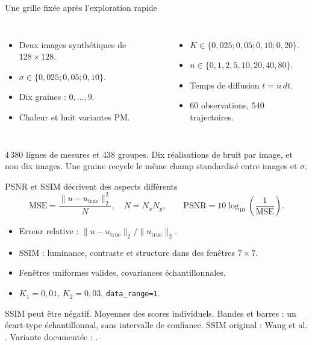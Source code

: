 \documentclass[aspectratio=169,11pt]{beamer}
\newcommand{\sectionlabel}{Projet de Master}
\newcommand{\utrue}{u_{\mathrm{true}}}
\newcommand{\smallgap}{\vspace{0.18cm}}
\begin{document}
\renewcommand{\sectionlabel}{02 / Protocole et vérification}
\begin{frame}[label=protocole]{Une grille fixée après l'exploration rapide}
  \begin{columns}[T,onlytextwidth]
    \begin{itemize}
      \item Deux images synthétiques de $128\times128$.
      \item $\sigma\in\{0{,}025;0{,}05;0{,}10\}$.
      \item Dix graines : $0,\ldots,9$.
      \item Chaleur et huit variantes PM.
    \end{itemize}
    \begin{itemize}
      \item $K\in\{0{,}025;0{,}05;0{,}10;0{,}20\}$.
      \item $n\in\{0,1,2,5,10,20,40,80\}$.
      \item Temps de diffusion $t=n\,dt$.
      \item $60$ observations, $540$ trajectoires.
    \end{itemize}
  \end{columns}
  \smallgap
  $4\,380$ lignes de mesures et $438$ groupes.
  Dix réalisations de bruit par image, et non dix images.
  Une graine recycle le même champ standardisé entre images et $\sigma$.
\end{frame}

\begin{frame}[label=metriques]{PSNR et SSIM décrivent des aspects différents}
  \[
    \mathrm{MSE}=\frac{\|u-\utrue\|_2^2}{N},\quad N=N_xN_y,\qquad
    \mathrm{PSNR}=10\log_{10}\!\left(\frac{1}{\mathrm{MSE}}\right).
  \]
  \begin{itemize}
    \item Erreur relative : $\|u-\utrue\|_2/\|\utrue\|_2$.
    \item SSIM : luminance, contraste et structure dans des fenêtres $7\times7$.
    \item Fenêtres uniformes valides, covariances échantillonnales.
    \item $K_1=0{,}01$, $K_2=0{,}03$, \texttt{data\_range=1}.
  \end{itemize}
  \smallgap
  SSIM peut être négatif. Moyennes des scores individuels.
  Bandes et barres : un écart-type échantillonnal, sans intervalle de confiance.
  {\footnotesize SSIM original : Wang et al. \cite{wang2004}.
  Variante documentée : \cite{skimage_metrics}.}
\end{frame}
\end{document}
